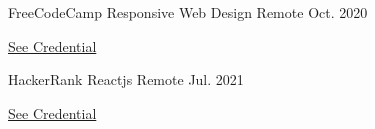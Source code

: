 
\begin{cventries}

  \cventry
    {FreeCodeCamp} %
    {Responsive Web Design} %
    {Remote} %
    {Oct. 2020} %
    {
      \begin{cvitems} %
        {\href{https://www.freecodecamp.org/certification/fcc2fa1c58e-7fb9-4620-95df-0fce875d29ff/responsive-web-design}{See Credential}}
      \end{cvitems}   }

  \cventry
    {HackerRank} %
    {Reactjs} %
    {Remote} %
    {Jul. 2021} %
    {
      \begin{cvitems} %
        {\href{https://www.hackerrank.com/certificates/7e54bf01671c}{See Credential}}
      \end{cvitems}
    }

\end{cventries}
